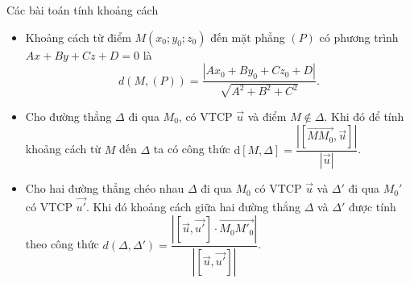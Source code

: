 \begin{dang}{Các bài toán tính khoảng cách}
	\begin{itemize}
		\item Khoảng cách từ điểm $M(x_0;y_0;z_0)$ đến mặt phẳng $(P)$ có phương trình $Ax+By+Cz+D=0$ là $$d(M,(P))=\dfrac{|Ax_0+By_0+Cz_0+D|}{\sqrt{A^2+B^2+C^2}}.$$
		\item Cho đường thẳng $\Delta $ đi qua $M_0$, có VTCP $\vec{u}$ và điểm $M\notin \Delta $. Khi đó để tính khoảng cách từ $M$ đến $\Delta $ ta có công thức $\mathrm{d}\left[M,\Delta \right]=\dfrac{\left|\left[\vec{MM_0},\vec{u}\right] \right|}{\left| \vec{u} \right|}$.
		\item Cho hai đường thẳng chéo nhau $\Delta $ đi qua $M_0$ có VTCP $\vec{u}$ và $\Delta'$ đi qua $M_0'$ có VTCP $\vec{u'}$. Khi đó khoảng cách giữa hai đường thẳng $\Delta $ và $\Delta '$ được tính theo công thức $d(\Delta ,\Delta ' )=\dfrac{\left| \left[ \vec{u},\vec{u'} \right]\cdot\vec{M_0M'_0}\right|}{\left| \left[ \vec{u},\vec{u'} \right] \right|}$.
	\end{itemize}
\end{dang}

